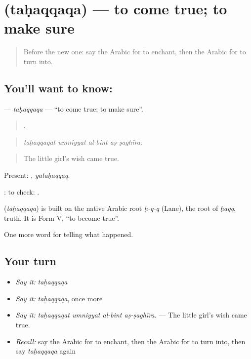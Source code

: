 \section[\texorpdfstring{\ar{تحقق} (taḥaqqaqa)}{تحقق (taḥaqqaqa)}]{ (taḥaqqaqa) — to come true; to make sure}

\label{lesson:AR-C344-tahaqqaqa}



\begin{quote}
Before the new one: say the Arabic for to enchant, then the Arabic for to turn into.
\end{quote}

\subsection*{You'll want to know: }
\textbf{} — \emph{taḥaqqaqa} — \textquotedblleft{}to come true; to make sure\textquotedblright{}.

\begin{quote}
   .
\end{quote}

\begin{quote}
\emph{taḥaqqaqat umniyyat al-bint aṣ-ṣaghīra.}
\end{quote}

\begin{quote}
The little girl’s wish came true.
\end{quote}

Present: , \emph{yataḥaqqaq}.

 : to check:   .

\begin{cousinweb}
\textbf{} (\emph{taḥaqqaqa}) is built on the native Arabic root \emph{ḥ-q-q} (Lane), the root of \emph{ḥaqq}, truth. It is Form V, \textquotedblleft{}to become true\textquotedblright{}.
\end{cousinweb}

\begin{grammarlens}[title={What you've built}]
One more word for telling what happened.
\end{grammarlens}

\subsection*{Your turn}
\begin{itemize}
\raggedright
  \item \emph{Say it:} \emph{taḥaqqaqa}
  \item \emph{Say it:} \emph{taḥaqqaqa}, once more
  \item \emph{Say it:} \emph{taḥaqqaqat umniyyat al-bint aṣ-ṣaghīra.} — The little girl’s wish came true.
  \item \emph{Recall:} say the Arabic for to enchant, then the Arabic for to turn into, then say \emph{taḥaqqaqa} again
\end{itemize}

